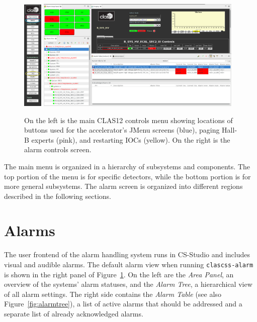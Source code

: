 \documentclass[amsmath,amssymb,notitlepage,11pt]{revtex4}
\begin{document}
\begin{figure}[htpb]\centering
    \includegraphics[width=0.08\textwidth]{pics/mainmenu}\hspace{0.5cm}
  \includegraphics[width=0.88\textwidth]{pics/clas12alarm}
  \caption{On the left is the main CLAS12 controls menu showing locations of buttons used for the accelerator's JMenu screens (blue), paging Hall-B experts (pink), and restarting IOCs (yellow).  On the right is the alarm controls screen.\label{fig:mainmenu}}
\end{figure}

The main menu is organized in a hierarchy of subsystems and components.  The top portion of the menu is for specific detectors, while the bottom portion is for more general subsystems.  The alarm screen is organized into different regions described in the following sections.

\section{Alarms}

The user frontend of the alarm handling system runs in CS-Studio and includes visual and audible alarms.  The default alarm view when running \texttt{clascss-alarm} is shown in the right panel of Figure~\ref{fig:mainmenu}.  On the left are the {\em Area Panel}, an overview of the systems' alarm statuses, and the {\em Alarm Tree}, a hierarchical view of all alarm settings.  The right side contains the {\em Alarm Table} (see also Figure~\ref{fig:alarmtree}), a list of active alarms that should be addressed and a separate list of already acknowledged alarms.  
\end{document}
